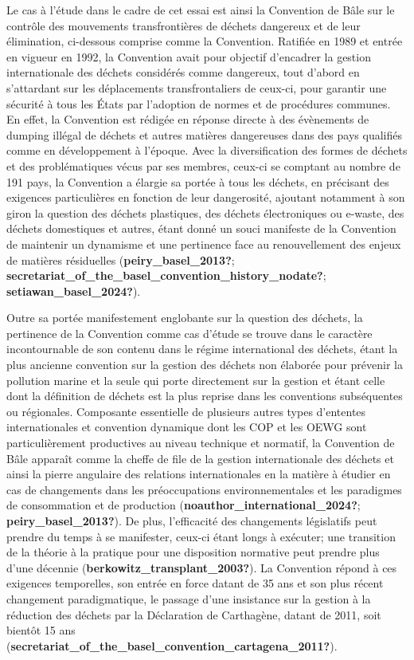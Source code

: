 \documentclass[12pt]{ulaval}
\begin{document}
Le cas à l'étude dans le cadre de cet essai est ainsi la Convention de Bâle sur le contrôle des mouvements transfrontières de déchets dangereux et de leur élimination, ci-dessous comprise comme la Convention. Ratifiée en 1989 et entrée en vigueur en 1992, la Convention avait pour objectif d'encadrer la gestion internationale des déchets considérés comme dangereux, tout d'abord en s'attardant sur les déplacements transfrontaliers de ceux-ci, pour garantir une sécurité à tous les États par l'adoption de normes et de procédures communes. En effet, la Convention est rédigée en réponse directe à des évènements de dumping illégal de déchets et autres matières dangereuses dans des pays qualifiés comme en développement à l'époque. Avec la diversification des formes de déchets et des problématiques vécus par ses membres, ceux-ci se comptant au nombre de 191 pays, la Convention a élargie sa portée à tous les déchets, en précisant des exigences particulières en fonction de leur dangerosité, ajoutant notamment à son giron la question des déchets plastiques, des déchets électroniques ou e-waste, des déchets domestiques et autres, étant donné un souci manifeste de la Convention de maintenir un dynamisme et une pertinence face au renouvellement des enjeux de matières résiduelles (\textbf{peiry\_basel\_2013?}; \textbf{secretariat\_of\_the\_basel\_convention\_history\_nodate?}; \textbf{setiawan\_basel\_2024?}).

Outre sa portée manifestement englobante sur la question des déchets, la pertinence de la Convention comme cas d'étude se trouve dans le caractère incontournable de son contenu dans le régime international des déchets, étant la plus ancienne convention sur la gestion des déchets non élaborée pour prévenir la pollution marine et la seule qui porte directement sur la gestion et étant celle dont la définition de déchets est la plus reprise dans les conventions subséquentes ou régionales. Composante essentielle de plusieurs autres types d'ententes internationales et convention dynamique dont les COP et les OEWG sont particulièrement productives au niveau technique et normatif, la Convention de Bâle apparaît comme la cheffe de file de la gestion internationale des déchets et ainsi la pierre angulaire des relations internationales en la matière à étudier en cas de changements dans les préoccupations environnementales et les paradigmes de consommation et de production (\textbf{noauthor\_international\_2024?}; \textbf{peiry\_basel\_2013?}). De plus, l'efficacité des changements législatifs peut prendre du temps à se manifester, ceux-ci étant longs à exécuter; une transition de la théorie à la pratique pour une disposition normative peut prendre plus d'une décennie (\textbf{berkowitz\_transplant\_2003?}). La Convention répond à ces exigences temporelles, son entrée en force datant de 35 ans et son plus récent changement paradigmatique, le passage d'une insistance sur la gestion à la réduction des déchets par la Déclaration de Carthagène, datant de 2011, soit bientôt 15 ans (\textbf{secretariat\_of\_the\_basel\_convention\_cartagena\_2011?}).
\end{document}
